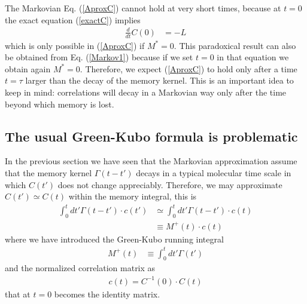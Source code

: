 \documentclass[a4paper,openright,12pt]{book}
\newcommand{\esc}{\!\cdot\!}
\begin{document}
The Markovian Eq.  (\ref{AproxC})  cannot hold at
very short times,  because at $t=0$ the  exact equation (\ref{exactC})
implies
\begin{align}
    \frac{d}{dt}C(0)&=-L
\end{align}
which is only possible in  (\ref{AproxC}) if $M^*=0$. This paradoxical
result can  also be obtained  from Eq.  (\ref{Markov1}) because  if we
set $t=0$  in that  equation we obtain  again $M^*=0$.   Therefore, we
expect (\ref{AproxC}) to  hold  only after a time
$t=\tau$  larger than  the  decay of  the memory  kernel.  This is  an
important idea to keep in mind: correlations will decay in a Markovian
way only  after the time  beyond which memory  is lost. 

\subsection{The usual Green-Kubo formula is problematic}
In the previous section we have seen that the Markovian approximation assume that the memory kernel $\Gamma(t-t')$ decays in a typical molecular time scale in which $C(t')$ does not change appreciably. Therefore, we may approximate $C(t')\simeq C(t)$ within the memory integral, this is
\begin{align}
  \int_0^tdt' \Gamma(t-t')\esc c(t')&\simeq  \int_0^tdt' \Gamma(t-t')\esc  c(t)
\nonumber\\
&\equiv
M^+(t)\esc c(t)
\end{align}
where we have introduced the Green-Kubo running integral
\begin{align}
M^+(t)&\equiv  \int_0^tdt' \Gamma(t') 
\label{Mt}
\end{align}
and the normalized correlation matrix as
\begin{align}
  c(t)=C^{-1}(0)\esc C(t)
\end{align}
that at $t=0$ becomes the identity matrix.
\end{document}
